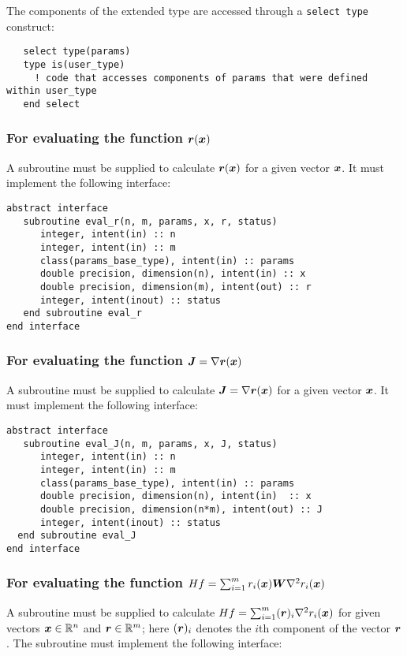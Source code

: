 \documentclass{spec}
\begin{document}
The components of the extended type are accessed through a \texttt{select type}
construct:
\begin{verbatim}
   select type(params)
   type is(user_type)
     ! code that accesses components of params that were defined within user_type
   end select
\end{verbatim}

\subsubsection{For evaluating the function ${\bm r}({\bm x})$}

A subroutine must be supplied to calculate ${\bm r}({\bm x})$ for a given vector ${\bm x}$.
It must implement the following interface:

\begin{verbatim}
abstract interface
   subroutine eval_r(n, m, params, x, r, status)
      integer, intent(in) :: n
      integer, intent(in) :: m
      class(params_base_type), intent(in) :: params
      double precision, dimension(n), intent(in) :: x
      double precision, dimension(m), intent(out) :: r
      integer, intent(inout) :: status
   end subroutine eval_r
end interface
\end{verbatim}



\subsubsection{For evaluating the function ${\bm J} = \nabla {\bm r}({\bm x})$}
A subroutine must be supplied to calculate ${\bm J} = \nabla {\bm r}({\bm x})$ for a given vector ${\bm x}$. It
must implement the following interface:

\begin{verbatim}
abstract interface
   subroutine eval_J(n, m, params, x, J, status)
      integer, intent(in) :: n
      integer, intent(in) :: m
      class(params_base_type), intent(in) :: params
      double precision, dimension(n), intent(in)  :: x
      double precision, dimension(n*m), intent(out) :: J
      integer, intent(inout) :: status
  end subroutine eval_J
end interface
\end{verbatim}



\subsubsection{For evaluating the function $Hf = \sum_{i=1}^m r_i({\bm x}) {\bm W} \nabla^2 r_i({\bm x})$}
A subroutine must be supplied to calculate $Hf = \sum_{i=1}^m ({\bm r})_i \nabla^2 r_i({\bm x})$ for given vectors ${\bm x} \in \mathbb{R}^n$ and ${\bm r} \in \mathbb{R}^m$; here \(({\bm r})_i\) denotes the $i$th component of the vector ${\bm r}$. The subroutine must implement the following interface:
\end{document}
